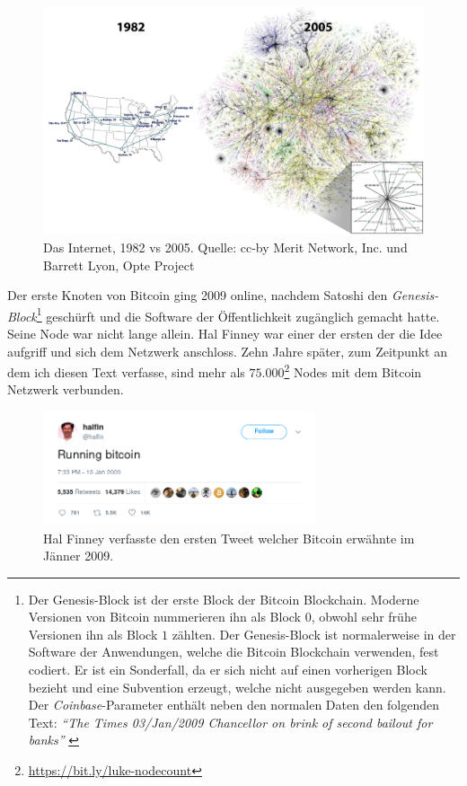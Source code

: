 \begin{figure}
  \includegraphics{assets/images/internet-evolution-white-dates.png}
  \caption{Das Internet, 1982 vs 2005. Quelle: cc-by Merit Network, Inc. und
  Barrett Lyon, Opte Project}
  \label{fig:internet-evolution-white-dates}
\end{figure}

Der erste Knoten von Bitcoin ging 2009 online, nachdem Satoshi den
\textit{Genesis-Block}\footnote{ Der Genesis-Block ist der erste Block der
Bitcoin Blockchain. Moderne Versionen von Bitcoin nummerieren ihn als Block $0$,
obwohl sehr frühe Versionen ihn als Block $1$ zählten. Der Genesis-Block ist
normalerweise in der Software der Anwendungen, welche die Bitcoin Blockchain
verwenden, fest codiert.  Er ist ein Sonderfall, da er sich nicht auf einen
vorherigen Block bezieht und eine Subvention erzeugt, welche nicht ausgegeben
werden kann. Der \textit{Coinbase}-Parameter enthält neben den normalen Daten
den folgenden Text: \textit{\enquote{The Times 03/Jan/2009 Chancellor on brink
of second bailout for banks}} \cite{btcwiki:genesis-block}} geschürft und die
Software der Öffentlichkeit zugänglich gemacht hatte. Seine Node war nicht
lange allein. Hal Finney war einer der ersten der die Idee aufgriff und
sich dem Netzwerk anschloss. Zehn Jahre später, zum Zeitpunkt an dem ich diesen
Text verfasse, sind mehr als
$75.000$\footnote{\url{https://bit.ly/luke-nodecount}} Nodes mit dem Bitcoin
Netzwerk verbunden.

\begin{figure}
  \centering
  \includegraphics[width=8cm]{assets/images/running-bitcoin.png}
  \caption{Hal Finney verfasste den ersten Tweet welcher Bitcoin erwähnte im
  Jänner 2009.}
  \label{fig:running-bitcoin}
\end{figure}

